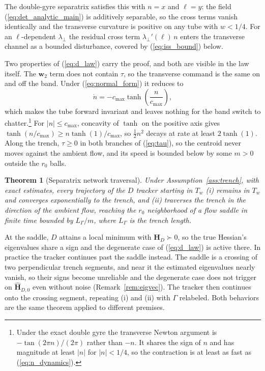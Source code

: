 \documentclass[lettersize,journal]{IEEEtran}
\newtheorem{theorem}{Theorem}
\begin{document}
The double-gyre separatrix satisfies this with $n = x$ and $\ell = y$:
the field (\ref{eq:det_analytic_main}) is additively separable, so the
cross terms vanish identically and the transverse curvature is positive
on any tube with $w < 1/4$. For an $\ell$-dependent $\lambda_\perp$ the
residual cross term $\lambda_\perp'(\ell)\,n$ enters the transverse
channel as a bounded disturbance, covered by (\ref{eq:iss_bound}) below.

Two properties of (\ref{eq:d_law}) carry the proof, and both are visible
in the law itself. The $\mathbf{w}_2$ term does not contain $\tau$, so
the transverse command is the same on and off the band. Under
(\ref{eq:normal_form}) it reduces to
\begin{equation}
    \dot{n} = -c_{\max}\tanh\!\left(\frac{n}{c_{\max}}\right),
    \label{eq:n_dynamics}
\end{equation}
which makes the tube forward invariant and leaves nothing for the band
switch to chatter.\footnote{Under the exact double gyre the transverse
Newton argument is $-\tan(2\pi n)/(2\pi)$ rather than $-n$. It shares the
sign of $n$ and has magnitude at least $|n|$ for $|n| < 1/4$, so the
contraction is at least as fast as (\ref{eq:n_dynamics}).} For $|n| \leq
c_{\max}$, concavity of $\tanh$ on the positive axis gives
$\tanh(n/c_{\max}) \geq n\tanh(1)/c_{\max}$, so $\tfrac{1}{2}n^2$ decays
at rate at least $2\tanh(1)$. Along the trench, $\tau \geq 0$ in both branches of
(\ref{eq:tau}), so the centroid never moves against the ambient flow,
and its speed is bounded below by some $m > 0$ outside the $r_0$ balls.

\begin{theorem}[Separatrix network traversal]
\label{thm:separatrix}
Under Assumption~\ref{ass:trench}, with exact estimates, every
trajectory of the $D$ tracker starting in $T_w$ (i) remains in $T_w$ and
converges exponentially to the trench, and (ii) traverses the trench in
the direction of the ambient flow, reaching the $r_0$ neighborhood of a
flow saddle in finite time bounded by $L_\Gamma/m$, where $L_\Gamma$ is
the trench length.
\end{theorem}

At the saddle, $D$ attains a local minimum with $\mathbf{H}_D \succ 0$,
so the true Hessian's eigenvalues share a sign and the degenerate case
of (\ref{eq:d_law}) is active there. In practice the tracker continues
past the saddle instead. The saddle is a crossing of
two perpendicular trench segments, and
near it the estimated eigenvalues nearly vanish, so their signs become
unreliable and the degenerate case does not trigger on
$\hat{\mathbf{H}}_{D,0}$ even without noise
(Remark~\ref{rem:eigvec}). The tracker then continues onto the crossing
segment, repeating (i) and (ii) with $\Gamma$ relabeled. Both
behaviors are the same theorem applied to different premises.
\end{document}
